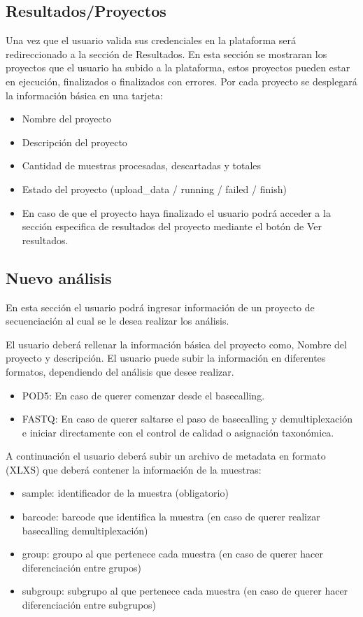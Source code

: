 \subsection{Resultados/Proyectos}
Una vez que el usuario valida sus credenciales en la plataforma será redireccionado a la sección de Resultados. En esta sección se mostraran los proyectos que el usuario ha subido a la plataforma, estos proyectos pueden estar en ejecución, finalizados o finalizados con errores. 
Por cada proyecto se desplegará la información básica en una tarjeta:
\begin{itemize}
    \item Nombre del proyecto
    \item Descripción del proyecto
    \item Cantidad de muestras procesadas, descartadas y totales
    \item Estado del proyecto (upload\_data / running / failed / finish)
    \item En caso de que el proyecto haya finalizado el usuario podrá acceder a la sección especifica de resultados del proyecto mediante el botón de Ver resultados.
\end{itemize}
\subsection{Nuevo análisis}
En esta sección el usuario podrá ingresar información de un proyecto de secuenciación al cual se le desea realizar los análisis.

El usuario deberá rellenar la información básica del proyecto como, Nombre del proyecto y descripción. El usuario puede subir la información en diferentes formatos, dependiendo del análisis que desee realizar.
\begin{itemize}
    \item POD5: En caso de querer comenzar desde el basecalling.
    \item FASTQ: En caso de querer saltarse el paso de basecalling y demultiplexación e iniciar directamente con el control de calidad o asignación taxonómica.
\end{itemize}

A continuación el usuario deberá subir un archivo de metadata en formato (XLXS) que deberá contener la información de la muestras:
\begin{itemize}
    \item sample: identificador de la muestra (obligatorio)
    \item barcode: barcode que identifica la muestra (en caso de querer realizar basecalling demultiplexación)
    \item group: groupo al que pertenece cada muestra (en caso de querer hacer diferenciación entre grupos)
    \item subgroup: subgrupo al que pertenece cada muestra (en caso de querer hacer diferenciación entre subgrupos)
\end{itemize}

